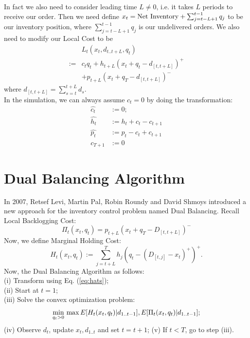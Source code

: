 \documentclass[twoside]{article}
\begin{document}
\begin{multicols}{2}
    In fact we also need to consider leading time $L \neq 0$, i.e. it takes $L$ periods to receive our order. Then we need define $x_t={\rm Net~Inventory}  + \sum_{j = t - L+1}^{t-1} q_j$ to be our inventory position, where $\sum_{j = t - L+1}^{t-1} q_j$ is our undelivered orders. We also need to modify our Local Cost to be 
        \begin{equation}\label{eq:Lneq0}
        \begin{array}{rl}
              & L_t(x_t,d_{t..t+L},q_t)\\
          := &c_tq_t + h_{t+L}(x_t + q_t - d_{[t,t+L]})^{+}\\
                                &  + p_{t+L}(x_t + q_T - d_{[t,t+L]})^{-}
        \end{array}
        \end{equation}
        where $d_{[t,t+L]}=\sum_{s=t}^{t+L} d_s$.\\
        In the simulation, we can always assume $c_t = 0$ by doing the transformation:
        \begin{equation}\label{eq:hats}
        \begin{array}{rl}
          \hat{c_t} &:= 0;\nonumber\\
          \hat{h_t} &:= h_t + c_t - c_{t+1}\nonumber\\
          \hat{p_t} &:= p_t - c_t + c_{t+1}\nonumber\\
          c_{T+1} &:= 0\nonumber
        \end{array}
        \end{equation}

\section{Dual Balancing Algorithm}    
    In 2007, Retsef Levi, Martin Pal, Robin Roundy and David Shmoys introduced a new approach\cite{CLAcha2} for the inventory control problem named Dual Balancing. Recall Local Backlogging Cost:
    \begin{equation}\label{eq:Bcost}
    \Pi_t(x_t,q_t) = p_{t+L}(x_t + q_T - D_{[t,t+L]})^{-}
    \end{equation}
    Now, we define Marginal Holding Cost:
    \begin{equation}\label{eq:MHcost}
    H_t(x_t,q_t) := \sum_{j = t+L}^{T} h_j (q_t - (D_{[t,j]} - x_t)^+)^+.
    \end{equation}
    Now, the Dual Balancing Algorithm as follows:\\
    (i) Transform using Eq. (\ref{eq:hats});\\
    (ii) Start at $t=1$;\\
    (iii) Solve the convex optimization problem:
    \begin{equation}\label{eq:ConvexOP}
        \min_{q_t > 0}\\ \max{E[H_t(x_t,q_t)| d_{1..t-1}], E[\Pi_t(x_t,q_t)| d_{1..t-1}]};
        \end{equation}
    (iv) Observe $d_t$, update $x_t,d_{1..t}$ and set $t=t+1$;
    (v) If $t<T$, go to step (iii).\\


\end{multicols}
\end{document}
